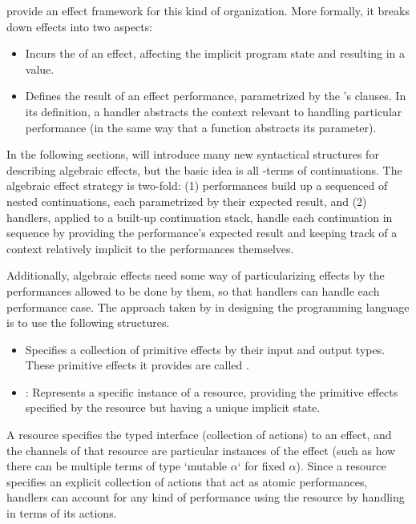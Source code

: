  provide an effect framework for this kind of organization.
More formally, it breaks down effects into two aspects:
%
\begin{itemize}
\item
  Incurs the  of an effect, affecting the implicit program state and resulting in a value.
\item
  Defines the result of an effect performance, parametrized by the 's clauses.
  In its definition, a handler abstracts the context relevant to handling particular performance (in the same way that a function abstracts its parameter).
\end{itemize}
%
In the following sections, \LangD will introduce many new syntactical structures for describing algebraic effects, but the basic idea is all \LangA-terms of continuations.
The algebraic effect strategy is two-fold:
(1) performances build up a sequenced of nested continuations, each parametrized by their expected result, and
(2) handlers, applied to a built-up continuation stack, handle each continuation in sequence by providing the performance's expected result and keeping track of a context relatively implicit to the performances themselves.

Additionally, algebraic effects need some way of particularizing effects by the performances allowed to be done by them, so that handlers can handle each performance case.
The approach taken by \cite{Bauer2015ProgrammingWA} in designing the  programming language is to use the following structures.
\begin{itemize}
\item
  Specifies a collection of primitive effects by their input and output types.
  These primitive effects it provides are called .
\item
  :
  Represents a specific instance of a resource, providing the primitive effects specified by the resource but having a unique implicit state.
\end{itemize}
A resource specifies the typed interface (collection of actions) to an effect, and
the channels of that resource are particular instances of the effect
(such as how there can be multiple terms of type \code`mutable $α$` for fixed $α$).
Since a resource specifies an explicit collection of actions that act as atomic performances, handlers can account for any kind of performance using the resource by handling in terms of its actions.

